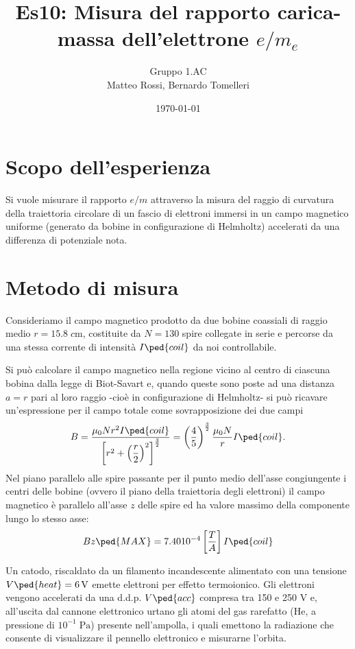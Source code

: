\documentclass[10pt, a4paper, italian]{article}
\author{Gruppo 1.AC \\ Matteo Rossi, Bernardo Tomelleri}
\title{Es10: Misura del rapporto carica-massa dell'elettrone $e/m_e$}
\begin{document}
\date{\today}
\maketitle

\section{Scopo dell'esperienza}
Si vuole misurare il rapporto $e/m$ attraverso la misura del raggio di
curvatura della traiettoria circolare di un fascio di elettroni immersi in un
campo magnetico uniforme (generato da bobine in configurazione di Helmholtz)
accelerati da una differenza di potenziale nota.

\section{Metodo di misura}
Consideriamo il campo magnetico prodotto da due bobine coassiali di raggio
medio $r = 15.8 \; \si{c\m}$, costituite da $N = 130$ spire collegate in
serie e percorse da una stessa corrente di intensità $I\ped{coil}$ da noi
controllabile.

Si può calcolare il campo magnetico nella regione vicino al centro di ciascuna
bobina dalla legge di Biot-Savart e, quando queste sono poste ad una distanza
$a = r$ pari al loro raggio -cioè in configurazione di Helmholtz- si può
ricavare un'espressione per il campo totale come sovrapposizione dei due campi
\begin{equation}\label{eq: B-helm}
    B = \frac{\mu_0 N r^2 I\ped{coil}}{\left[r^2 + \left(\dfrac{r}{2}\right)^2
    \right]^\frac{3}{2}} =
    \left(\frac{4}{5}\right)^{\frac{3}{2}} \frac{\mu_{0} N}{r} I\ped{coil}.
\end{equation}
Nel piano parallelo alle spire passante per il punto medio dell'asse
congiungente i centri delle bobine (ovvero il piano della traiettoria degli
elettroni) il campo magnetico è parallelo all'asse $z$ delle spire ed ha
valore massimo della componente lungo lo stesso asse:
\begin{equation}\label{eq: Bmax}
Bz\ped{MAX} = 7.40 10^{-4} \left[\frac{T}{A}\right] I\ped{coil}
\end{equation}


Un catodo, riscaldato da un filamento incandescente alimentato con una
tensione $V\ped{heat} = \SI{6}{\V}$ emette elettroni per effetto termoionico.
Gli elettroni vengono accelerati da una d.d.p. $V\ped{acc}$ compresa tra 150
e 250 V e, all'uscita dal cannone elettronico urtano gli atomi del gas
rarefatto (He, a pressione di $10^{-1} \; \si{\Pa}$) presente nell'ampolla,
i quali emettono la radiazione che consente di visualizzare il pennello elettronico e
misurarne l'orbita.
\end{document}
